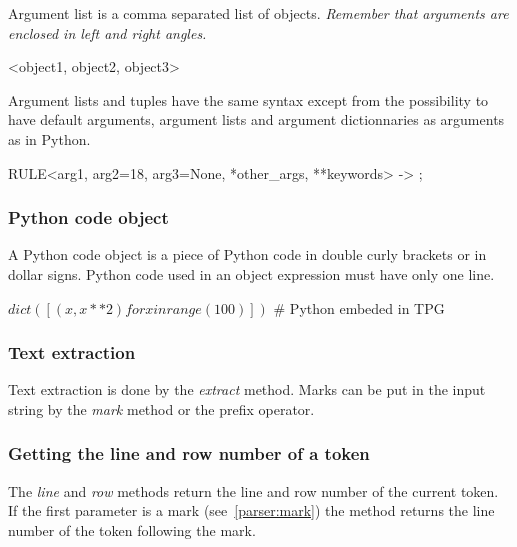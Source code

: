 Argument list is a comma separated list of objects.
\emph{Remember that arguments are enclosed in left and right angles.}

\begin{verbatimtab}[4]
	<object1, object2, object3>
\end{verbatimtab}

Argument lists and tuples have the same syntax except from the possibility to have
default arguments, argument lists and argument dictionnaries as arguments as in Python.

\begin{verbatimtab}[4]
	RULE<arg1, arg2=18, arg3=None, *other_args, **keywords> -> ;
\end{verbatimtab}

\subsubsection{Python code object}

A Python code object is a piece of Python code in double curly brackets or in dollar signs.
Python code used in an object expression must have only one line.

\begin{verbatimtab}[4]
	$ dict([ (x,x**2) for x in range(100) ]) $ # Python embeded in TPG
\end{verbatimtab}

\subsubsection{Text extraction}

Text extraction is done by the \emph{extract} method.
Marks can be put in the input string by the \emph{mark} method or the prefix \emph{\@} operator.


\subsubsection{Getting the line and row number of a token}

The \emph{line} and \emph{row} methods return the line and row number of the current token.
If the first parameter is a mark (see~\ref{parser:mark}) the method returns the line number of the token following the mark.

